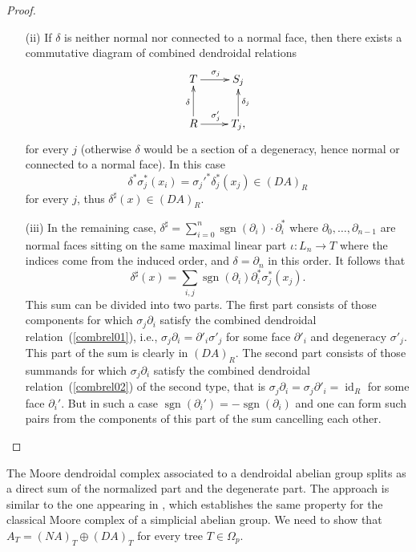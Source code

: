 \documentclass[a4paper]{amsart}
\theoremstyle{plain}
\theoremstyle{definition}
\theoremstyle{remark}
\DeclareMathOperator{\sgn}{sgn}
\DeclareMathOperator{\id}{id}
\newcommand{\rpd}{\Omega_p}
\newcommand{\To}{\longrightarrow}
\numberwithin{equation}{section}
\numberwithin{figure}{section}
\begin{document}
\begin{proof}
\begin{itemize}
        \item[{\rm (ii)}]If $\delta$ is neither normal nor connected to a normal face, then
              there exists a commutative diagram of combined dendroidal relations
              \[
                  \xymatrix{
                      T\ar[r]^{\sigma_j}&S_j\\
                      R\ar[r]^{\sigma_j'}\ar[u]^{\delta} &T_j\ar[u]_{\delta_j}, }
              \]
              for every $j$ (otherwise $\delta$ would be a section of a degeneracy, hence normal or connected to a normal face). In this case
              \[
                  \delta^*\sigma_j^*(x_i)=\sigma_j'^*\delta_j^*(x_j)\in (DA)_R
              \]
              for every $j$, thus $\delta^\sharp(x)\in (DA)_R$.
        \item[{\rm (iii)}] In the remaining case, $\delta^\sharp=\sum_{i=0}^n\sgn(\partial_i)\cdot\partial_i^*$ where $\partial_0,\ldots,\partial_{n-1}$ are normal faces sitting on the same maximal linear part $\iota\colon L_n\To T$ where the indices come from the induced order, and $\delta=\partial_n$ in this order. It follows that
              \[
                  \delta^\sharp(x)=\sum_{i,j}\sgn(\partial_i)\partial_i^*\sigma_j^*(x_j).
              \]
              This sum can be divided into two parts. The first part consists of those components for which $\sigma_j\partial_i$ satisfy the combined dendroidal relation~(\ref{combrel01}), i.e., $\sigma_j\partial_i=\partial'_i\sigma'_j$ for some face $\partial'_i$ and degeneracy $\sigma'_j$. This part of the sum is clearly in $(DA)_R$. The second part consists of those summands for which $\sigma_j\partial_i$ satisfy the combined dendroidal
              relation~(\ref{combrel02}) of the second type, that is $\sigma_j\partial_i=\sigma_j\partial'_i=\id_R$ for some face $\partial_i'$. But in such a case $\sgn(\partial_i')=-\sgn(\partial_i)$ and one can form such pairs from the
              components of this part of the sum cancelling each other.
    \end{itemize}
\end{proof}

The Moore dendroidal complex associated to a dendroidal abelian group splits as a direct sum of the normalized part and the degenerate part. The approach is similar to the one appearing in \cite{weibel}, which establishes the same property for the classical Moore complex of a simplicial abelian group. We need to show that $A_T=(NA)_T\oplus (DA)_T$ for every tree $T\in\rpd$.
\end{document}
